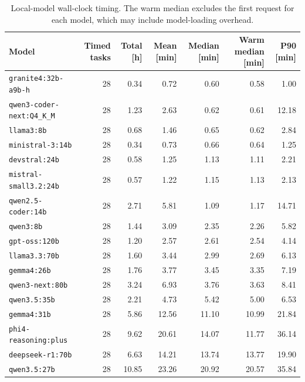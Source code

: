 \begin{table}[t]
\centering
\small
\caption{Local-model wall-clock timing. The warm median excludes the first
request for each model, which may include model-loading overhead.}
\label{tab:local-runtime-summary}
\begin{tabular}{lrrrrrr}
\toprule
Model & Timed tasks & Total [h] & Mean [min] & Median [min] &
Warm median [min] & P90 [min] \\
\midrule
\texttt{granite4:32b-a9b-h} & 28 & 0.34 & 0.72 & 0.60 & 0.58 & 1.00 \\
\texttt{qwen3-coder-next:Q4\_K\_M} & 28 & 1.23 & 2.63 & 0.62 & 0.61 & 12.18 \\
\texttt{llama3:8b} & 28 & 0.68 & 1.46 & 0.65 & 0.62 & 2.84 \\
\texttt{ministral-3:14b} & 28 & 0.34 & 0.73 & 0.66 & 0.64 & 1.25 \\
\texttt{devstral:24b} & 28 & 0.58 & 1.25 & 1.13 & 1.11 & 2.21 \\
\texttt{mistral-small3.2:24b} & 28 & 0.57 & 1.22 & 1.15 & 1.13 & 2.13 \\
\texttt{qwen2.5-coder:14b} & 28 & 2.71 & 5.81 & 1.09 & 1.17 & 14.71 \\
\texttt{qwen3:8b} & 28 & 1.44 & 3.09 & 2.35 & 2.26 & 5.82 \\
\texttt{gpt-oss:120b} & 28 & 1.20 & 2.57 & 2.61 & 2.54 & 4.14 \\
\texttt{llama3.3:70b} & 28 & 1.60 & 3.44 & 2.99 & 2.69 & 6.13 \\
\texttt{gemma4:26b} & 28 & 1.76 & 3.77 & 3.45 & 3.35 & 7.19 \\
\texttt{qwen3-next:80b} & 28 & 3.24 & 6.93 & 3.76 & 3.63 & 8.41 \\
\texttt{qwen3.5:35b} & 28 & 2.21 & 4.73 & 5.42 & 5.00 & 6.53 \\
\texttt{gemma4:31b} & 28 & 5.86 & 12.56 & 11.10 & 10.99 & 21.84 \\
\texttt{phi4-reasoning:plus} & 28 & 9.62 & 20.61 & 14.07 & 11.77 & 36.14 \\
\texttt{deepseek-r1:70b} & 28 & 6.63 & 14.21 & 13.74 & 13.77 & 19.90 \\
\texttt{qwen3.5:27b} & 28 & 10.85 & 23.26 & 20.92 & 20.57 & 35.84 \\
\bottomrule
\end{tabular}
\end{table}
